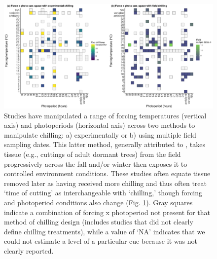 \documentclass[11pt,letter]{article}
\begin{document}
\clearpage


\clearpage
\begin{figure}[t!]
\centering
\includegraphics[width=1.1\textwidth]{..//..//analyses/limitingcues/figures/heatmapphotoxforcexchill2panel.pdf}
\caption{Studies have manipulated a range of forcing temperatures (vertical axis) and photoperiods (horizontal axis) across two methods to manipulate chilling: a) experimentally or  b) using multiple field sampling dates. This latter method, generally attributed to \citet{weinberger1950}, takes tissue (e.g., cuttings of adult dormant trees) from the field progressively across the fall and/or winter then exposes it to controlled environment conditions. These studies often equate tissue removed later as having received more chilling and thus often treat `time of cutting' as interchangeable with `chilling,'  though forcing and photoperiod conditions also change (Fig. \ref{fig:heatmaps}). Gray squares indicate a combination of forcing x photoperiod not present for that method of chilling design (includes studies that did not clearly define chilling treatments), while a value of `NA' indicates that we could not estimate a level of a particular cue because it was not clearly reported.}
  \label{fig:heatmaps} 
\end{figure}

\clearpage
\end{document}
